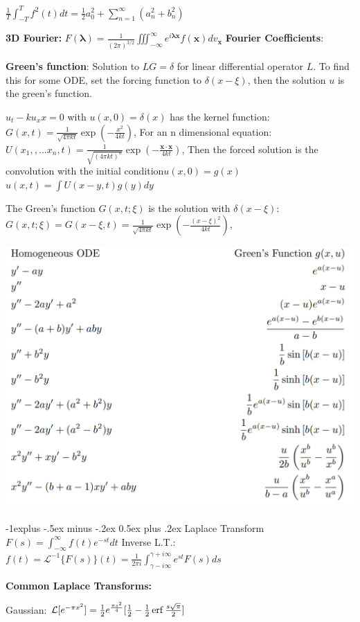 \documentclass{article}
\makeatletter
\theoremstyle{definition}
\renewcommand{\subsection}{\@startsection{subsection}{2}{0mm}%
	{-1explus -.5ex minus -.2ex}%
	{0.5ex plus .2ex}%
	{\normalfont\normalsize\bfseries}}
\makeatother
\begin{document}
\begin{multicols}{3}
$\frac{1}{T} \int_{-T}^{T} f^2(t) dt = \frac{1}{2} a_0^2  + \sum_{n=1}^\infty (a_n^2 + b_n^2)$

\textbf{3D Fourier:}
$F(\mathbf{\lambda}) = \frac{1}{(2 \pi)^{3/2}} \iiint_{-\infty}^\infty e^{i \mathbf{\lambda x}} f(\mathbf{x}) dv_\mathbf{x}$
\textbf{Fourier Coefficients}: 

\textbf{Green's function}: Solution to $LG = \delta$ for linear differential operator $L$.
To find this for some ODE, set the forcing function to $\delta(x-\xi)$, then the solution $u$ is the green's function. 

$u_t - ku_xx = 0$ with $u(x,0) = \delta(x)$ has the kernel function:
$G(x,t) = \frac{1}{\sqrt{4 \pi k t}} \exp \left(-\frac{x^2}{4kt}\right)$,
For an n dimensional equation:
$U(x_1,,...x_n,t) = \frac{1}{\sqrt{(4 \pi k t)^n}} \exp \left(-\frac{\mathbf{x \cdot x}}{4kt}\right)$,
Then the forced solution is the convolution with the initial condition$u(x,0) = g(x)$
$u(x,t) = \int U(x-y, t) g(y) dy$

The Green's function $G(x,t;\xi)$ is the solution with $\delta(x-\xi)$:
$G(x,t;\xi) =  G(x- \xi,t) =\frac{1}{\sqrt{4 \pi k t}} \exp \left(-\frac{(x-\xi)^2}{4kt}\right)$,



\includegraphics[width=0.7\linewidth]{green_common}



\subsection{Laplace Transform}
$F(s) = \int_{-\infty}^\infty f(t) e^{-st} dt$
Inverse L.T.:
$f(t) = \mathcal{L}^{-1}\{F(s)\}(t) = \frac{1}{2\pi i}\int_{\gamma - i \infty }^{\gamma + i \infty } e^{st} F(s) ds$

\textbf{Common Laplace Transforms:}

Gaussian: $\mathcal{L} [e^{-\pi x^2}] = \frac{1}{2} e^{\frac{\pi s^2}{4}} [\frac{1}{2} - \frac{1}{2} \erf{\frac{s\sqrt{\pi}}{2}}]$


\end{multicols}
\end{document}
